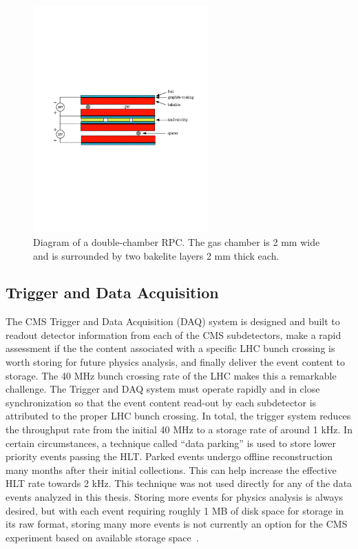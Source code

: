 \begin{figure}[htbp]
\centering
     \includegraphics[width=0.6\textwidth]{cms_and_lhc/plots/cms_muon_rpc.pdf}
     \caption{
Diagram of a double-chamber RPC. The gas chamber is 2 mm wide and is surrounded by two
bakelite layers 2 mm thick each.
     }
     \label{fig:cms_muon_rpc}
\end{figure}



\subsection{Trigger and Data Acquisition}
The CMS Trigger and Data Acquisition (DAQ) system is designed and built to readout detector
information from each of the CMS subdetectors, make a rapid assessment if the the content
associated with a specific LHC bunch crossing is worth storing for future physics analysis,
and finally deliver the event content to storage. The 40 MHz bunch crossing rate of
the LHC makes this a remarkable challenge. The Trigger and DAQ system must operate rapidly
and in close synchronization so that the event content read-out by each subdetector is attributed
to the proper LHC bunch crossing. In total, the trigger system reduces the throughput rate from the
initial 40 MHz to a storage rate of around 1 kHz. In certain circumstances, a technique called
``data parking'' is used to store lower priority events passing the HLT. Parked events undergo
offline reconstruction many months after their initial collections. This can help increase the
effective HLT rate towards 2 kHz. This technique was not used directly for any of the data events
analyzed in this thesis. Storing more events for physics analysis is
always desired, but with each event requiring roughly 1 MB of disk space for storage in its
raw format, storing many more events is not currently an option for the CMS experiment based 
on available storage space~\cite{CMS-Proposal}. 



